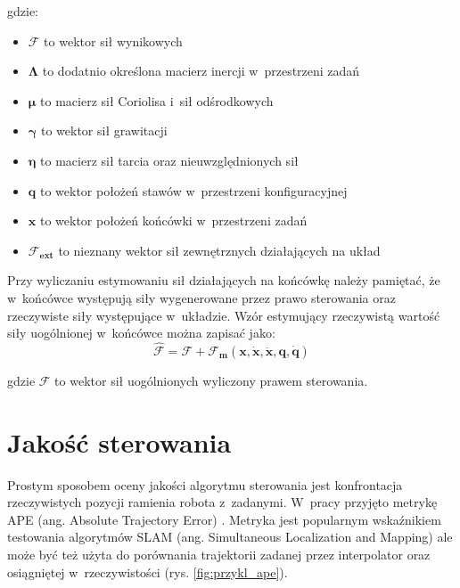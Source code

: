 gdzie:
\begin{itemize}
	\item $\boldsymbol{\mathcal{F}}$ to wektor sił wynikowych
	\item $\boldsymbol{\Lambda}$ to dodatnio określona macierz inercji w~przestrzeni zadań
	\item $\boldsymbol{\mu}$ to macierz sił Coriolisa i~sił odśrodkowych	
	\item $\boldsymbol{\gamma}$ to wektor sił grawitacji
	\item $\boldsymbol{\eta}$ to macierz sił tarcia oraz nieuwzględnionych sił
	\item $\boldsymbol{q}$ to wektor położeń stawów w~przestrzeni konfiguracyjnej
	\item $\boldsymbol{x}$ to wektor położeń końcówki w~przestrzeni zadań
	\item $ \boldsymbol{\mathcal{F}_{ext}}$ to nieznany wektor sił zewnętrznych działających na układ
\end{itemize} 

Przy wyliczaniu estymowaniu sił działających na końcówkę należy pamiętać, że w~końcówce występują siły wygenerowane przez prawo sterowania oraz rzeczywiste siły występujące w~układzie. Wzór estymujący rzeczywistą wartość siły uogólnionej w~końcówce można zapisać jako:
\begin{equation}
\boldsymbol{\mathcal{\hat{F}}} = \boldsymbol{\mathcal{F}} + \boldsymbol{\mathcal{F}_m}(\boldsymbol{x}, \dot{\boldsymbol{x}}, \ddot{\boldsymbol{x}}, \boldsymbol{q}, \dot{\boldsymbol{q}})
\end{equation}

gdzie $\boldsymbol{\mathcal{F}}$ to wektor sił uogólnionych wyliczony prawem sterowania.

\section{Jakość sterowania}
\label{chap:ape}
Prostym sposobem oceny jakości algorytmu sterowania jest konfrontacja rzeczywistych pozycji ramienia robota z~zadanymi. W~pracy przyjęto metrykę APE (ang. Absolute Trajectory Error) \cite{bib:ape}. Metryka jest popularnym wskaźnikiem testowania algorytmów SLAM (ang. Simultaneous Localization and Mapping) ale może być też użyta do porównania trajektorii zadanej przez interpolator  oraz osiągniętej w~rzeczywistości (rys. \ref{fig:przykl_ape}). 

